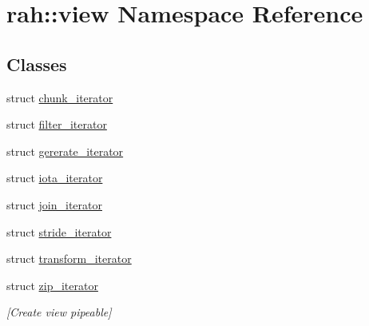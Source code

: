 \hypertarget{namespacerah_1_1view}{}\section{rah\+::view Namespace Reference}
\label{namespacerah_1_1view}
\subsection*{Classes}
\begin{DoxyCompactItemize}
\item 
struct \mbox{\hyperlink{structrah_1_1view_1_1chunk__iterator}{chunk\+\_\+iterator}}
\item 
struct \mbox{\hyperlink{structrah_1_1view_1_1filter__iterator}{filter\+\_\+iterator}}
\item 
struct \mbox{\hyperlink{structrah_1_1view_1_1gererate__iterator}{gererate\+\_\+iterator}}
\item 
struct \mbox{\hyperlink{structrah_1_1view_1_1iota__iterator}{iota\+\_\+iterator}}
\item 
struct \mbox{\hyperlink{structrah_1_1view_1_1join__iterator}{join\+\_\+iterator}}
\item 
struct \mbox{\hyperlink{structrah_1_1view_1_1stride__iterator}{stride\+\_\+iterator}}
\item 
struct \mbox{\hyperlink{structrah_1_1view_1_1transform__iterator}{transform\+\_\+iterator}}
\item 
struct \mbox{\hyperlink{structrah_1_1view_1_1zip__iterator}{zip\+\_\+iterator}}
\begin{DoxyCompactList}\small\item\em \mbox{[}Create view pipeable\mbox{]} \end{DoxyCompactList}\end{DoxyCompactItemize}
